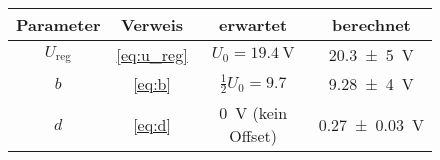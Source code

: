 \begin{figure}[h!]
\centering
{}
\begin{tabular}{c|c|c|c}
	Parameter & Verweis & erwartet & berechnet \\
	\hline
	$U_\text{reg}$ & \eqref{eq:u_reg}  & $U_0 = \SI{19.4}{\volt}$ & \SI{20,3(5)}{\volt} \\
	$b$ & \eqref{eq:b} & $\frac{1}{2} U_0 = 9.7$ & \SI{9,28(4)}{\volt} \\
	$d$ & \eqref{eq:d} & \SI{0}{\volt} (kein Offset) &  \SI{0.27(3)}{\volt}
\end{tabular}
\label{tab:fitparameter}
\end{figure}